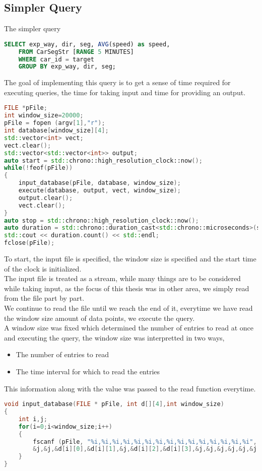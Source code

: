 \subsection{Simpler Query}
The simpler query
\begin{lstlisting}[language=SQL]
    SELECT exp_way, dir, seg, AVG(speed) as speed,
    FROM CarSegStr [RANGE 5 MINUTES]
    WHERE car_id = target
    GROUP BY exp_way, dir, seg;
\end{lstlisting}
The goal of implementing this query is to get a sense of time required for executing queries, the time for taking input and time for providing an output.\\
\begin{lstlisting}[language=C++]
FILE *pFile;
int window_size=20000;
pFile = fopen (argv[1],"r");
int database[window_size][4];
std::vector<int> vect;
vect.clear();
std::vector<std::vector<int>> output;
auto start = std::chrono::high_resolution_clock::now();
while(!feof(pFile))
{
    input_database(pFile, database, window_size);
    execute(database, output, vect, window_size);
    output.clear();
    vect.clear();
}
auto stop = std::chrono::high_resolution_clock::now(); 
auto duration = std::chrono::duration_cast<std::chrono::microseconds>(stop - start);
std::cout << duration.count() << std::endl;
fclose(pFile);
\end{lstlisting}
To start, the input file is specified, the window size is specified and the start time of the clock is initialized.\\
The input file is treated as a stream, while many things are to be considered while taking input, as the focus of this thesis was in other area, we simply read from the file part by part.\\
We continue to read the file until we reach the end of it, everytime we have read the window size amount of data points, we execute the query.\\
A window size was fixed which determined the number of entries to read at once and executing the query, the window size was interpretted in two ways,
\begin{itemize}
\item The number of entries to read 
\item The time interval for which to read the entries
\end{itemize}
This information along with the value was passed to the read function everytime.\\
\begin{lstlisting}[language=C++]
void input_database(FILE * pFile, int d[][4],int window_size)
{
    int i,j;
    for(i=0;i<window_size;i++)
    {
        fscanf (pFile, "%i,%i,%i,%i,%i,%i,%i,%i,%i,%i,%i,%i,%i,%i,%i", &j,
        &j,&j,&d[i][0],&d[i][1],&j,&d[i][2],&d[i][3],&j,&j,&j,&j,&j,&j,&j);
    }
}
\end{lstlisting}
